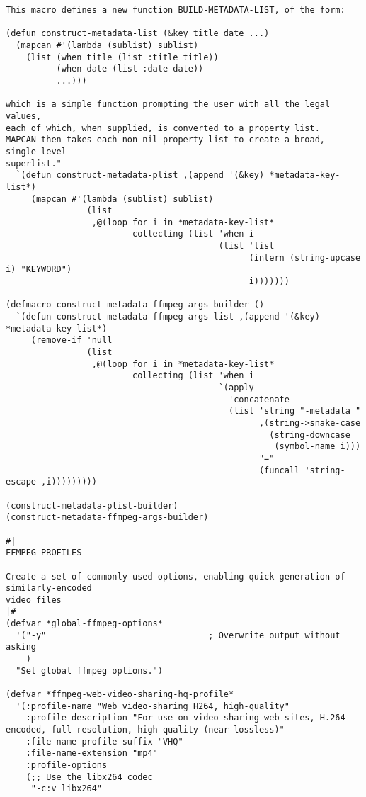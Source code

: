 \documentclass{article}
\begin{document}
\begin{verbatim}
This macro defines a new function BUILD-METADATA-LIST, of the form:

(defun construct-metadata-list (&key title date ...)
  (mapcan #'(lambda (sublist) sublist)
    (list (when title (list :title title))
          (when date (list :date date))
          ...)))

which is a simple function prompting the user with all the legal values,
each of which, when supplied, is converted to a property list.
MAPCAN then takes each non-nil property list to create a broad, single-level
superlist."
  `(defun construct-metadata-plist ,(append '(&key) *metadata-key-list*) 
     (mapcan #'(lambda (sublist) sublist)
                (list
                 ,@(loop for i in *metadata-key-list*
                         collecting (list 'when i
                                          (list 'list
                                                (intern (string-upcase i) "KEYWORD")
                                                i)))))))

(defmacro construct-metadata-ffmpeg-args-builder ()
  `(defun construct-metadata-ffmpeg-args-list ,(append '(&key) *metadata-key-list*) 
     (remove-if 'null
                (list
                 ,@(loop for i in *metadata-key-list*
                         collecting (list 'when i 
                                          `(apply
                                            'concatenate
                                            (list 'string "-metadata "
                                                  ,(string->snake-case
                                                    (string-downcase
                                                     (symbol-name i)))
                                                  "="
                                                  (funcall 'string-escape ,i)))))))))

(construct-metadata-plist-builder)
(construct-metadata-ffmpeg-args-builder)

#|
FFMPEG PROFILES

Create a set of commonly used options, enabling quick generation of similarly-encoded
video files
|#
(defvar *global-ffmpeg-options*
  '("-y"                                ; Overwrite output without asking
    )
  "Set global ffmpeg options.")

(defvar *ffmpeg-web-video-sharing-hq-profile*
  '(:profile-name "Web video-sharing H264, high-quality"
    :profile-description "For use on video-sharing web-sites, H.264-encoded, full resolution, high quality (near-lossless)"
    :file-name-profile-suffix "VHQ"
    :file-name-extension "mp4"
    :profile-options
    (;; Use the libx264 codec
     "-c:v libx264"
     

\end{verbatim}
\end{document}
